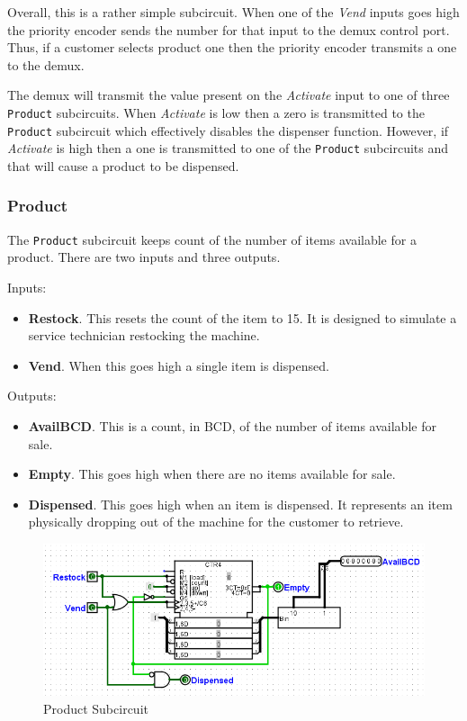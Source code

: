 Overall, this is a rather simple subcircuit. When one of the \textit{Vend} inputs goes high the priority encoder sends the number for that input to the demux control port. Thus, if a customer selects product one then the priority encoder transmits a one to the demux.

The demux will transmit the value present on the \textit{Activate} input to one of three \lstinline[columns=fixed]|Product| subcircuits. When \textit{Activate} is low then a zero is transmitted to the \lstinline[columns=fixed]|Product| subcircuit which effectively disables the dispenser function. However, if \textit{Activate} is high then a one is transmitted to one of the \lstinline[columns=fixed]|Product| subcircuits and that will cause a product to be dispensed.

\subsubsection{Product}

The \lstinline[columns=fixed]|Product| subcircuit keeps count of the number of items available for a product. There are two inputs and three outputs.

Inputs:

\begin{itemize}
	\item \textbf{Restock}. This resets the count of the item to 15. It is designed to simulate a service technician restocking the machine.
	\item \textbf{Vend}. When this goes high a single item is dispensed.
\end{itemize}

Outputs:

\begin{itemize}
	\item \textbf{AvailBCD}. This is a count, in \ac{BCD}, of the number of items available for sale.
	\item \textbf{Empty}. This goes high when there are no items available for sale.
	\item \textbf{Dispensed}. This goes high when an item is dispensed. It represents an item physically dropping out of the machine for the customer to retrieve.
\end{itemize}

\begin{figure}[H]
	\centering
	\includegraphics[width=\maxwidth{.95\linewidth}]{gfx/05-05}
	\caption{Product Subcircuit}
	\label{fig:05-05}
\end{figure}

